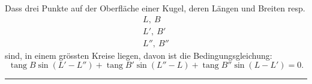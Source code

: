 Dass drei Punkte auf der Oberfläche einer Kugel, deren Längen und
Breiten resp.
\[
\begin{array}{l}
L,\ B\\
L',\ B'\\
L'',\ B''
\end{array}
\]
\noindent sind, in einem grössten Kreise liegen, davon ist die Bedingungsgleichung:
\[
\operatorname{tang}B\sin(L'-L'')+\operatorname{tang}B'\sin(L''-L)+
\operatorname{tang}B''\sin(L-L')=0.
\]

\begin{center}\rule{.18\textwidth}{.4pt}\end{center}

\par\clearpage
\noindent{}\makebox[12mm][r]{}\par\medskip

